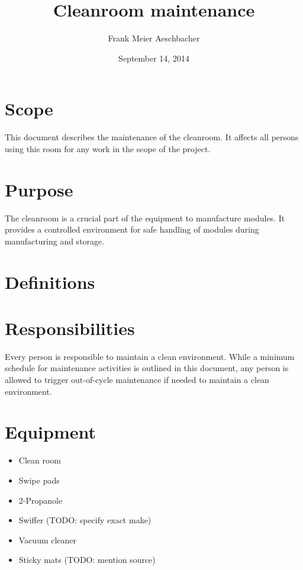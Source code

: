 \documentclass[12pt]{unlsilabsop}
\title{Cleanroom maintenance}
\date{September 14, 2014}
\author{Frank Meier Aeschbacher}
\begin{document}
\maketitle

\section{Scope}
This document describes the maintenance of the cleanroom. It affects all persons using this room for any work in the scope of the project.

\section{Purpose}
The cleanroom is a crucial part of the equipment to manufacture modules. It provides a controlled environment for safe handling of modules during manufacturing and storage.

\section{Definitions}

\section{Responsibilities}
Every person is responsible to maintain a clean environment. While a minimum schedule for maintenance activities is outlined in this document, any person is allowed to trigger out-of-cycle maintenance if needed to maintain a clean environment.

\section{Equipment}

\begin{itemize}
    \item Clean room
    \item Swipe pads
    \item 2-Propanole
    \item Swiffer (TODO: specify exact make)
    \item Vacuum cleaner
    \item Sticky mats (TODO: mention source)
\end{itemize}
\end{document}
